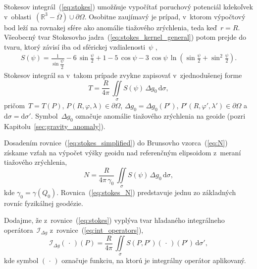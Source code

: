 \documentclass[a4paper, 12pt]{book}
\newcommand{\diff}{\mathrm d}
\begin{document}
Stokesov integrál~(\ref{eq:stokes}) umožňuje vypočítať poruchový potenciál 
kdekoľvek v~oblasti~$\left( \mathbb{R}^3 - \overline\Omega\right) \cup 
\partial\Omega$.  Osobitne zaujímavý je prípad, v~ktorom výpočtový bod leží na 
rovnakej sfére ako anomálie tiažového zrýchlenia, teda keď~$r = R$.  Všeobecný 
tvar Stokesovho jadra~(\ref{eq:stokes_kernel_general}) potom prejde do tvaru, 
ktorý závisí iba od sférickej vzdialenosti~$\psi$ 
\parencite{MoritzPhysicalGeodesy},
%
\begin{equation}
\label{eq:stokes_kernel}
\begin{split}
S(\psi) = \frac{1}{\sin\dfrac{\psi}{2}} - 6 \, \sin\frac{\psi}{2} + 1 - 5 \, 
\cos\psi - 3 \, \cos\psi \, \ln\left( \sin\frac{\psi}{2} + \sin^2\frac{\psi}{2} 
\right){.}
\end{split}
\end{equation}
%
Stokesov integrál sa v~takom prípade zvykne zapisovať v~zjednodušenej forme
%
\begin{equation}
\label{eq:stokes_simplified}
T = \frac{R}{4\pi} \, \iint\limits_{\sigma} S(\psi) \, \Delta g_0 \, \diff 
\sigma{,}
\end{equation}
%
pričom~$T = T(P)$, $P(R, \varphi, \lambda) \in \partial\Omega$, $\Delta g_0 
= \Delta g_0(P')$, $P'(R, \varphi', \lambda') \in \partial\Omega$ 
a~$\diff\sigma = \diff\sigma'$.  Symbol~$\Delta g_0$ označuje anomálie 
tiažového zrýchlenia na geoide (pozri Kapitolu~\ref{sec:gravity_anomaly}).

Dosadením rovnice~(\ref{eq:stokes_simplified}) do Brunsovho vzorca~(\ref{eq:N}) 
získame vzťah na výpočet výšky geoidu nad referenčným elipsoidom z~meraní 
tiažového zrýchlenia,
%
\begin{equation}
\label{eq:stokes_N}
N = \frac{R}{4\pi \, \gamma_0} \, \iint\limits_{\sigma} S(\psi) \, \Delta g_0 
\, \diff \sigma{,}
\end{equation}
%
kde $\gamma_0 = \gamma(Q_0)$.  Rovnica~(\ref{eq:stokes_N}) predstavuje jednu zo 
základných rovníc fyzikálnej geodézie.

Dodajme, že z~rovnice~(\ref{eq:stokes}) vyplýva tvar hľadaného integrálneho 
operátora~$\mathcal{I}_{\Delta g}$ z~rovnice~(\ref{eq:int_operators}),
%
\begin{equation}
\label{eq:iDg}
\mathcal{I}_{\Delta g}( \, \cdot \, )(P) = \frac{R}{4\pi} \, 
\iint\limits_\sigma S(P, P') ( \, \cdot \, )(P') \, \diff\sigma'{,}
\end{equation}
%
kde symbol $(\, \cdot \,)$ označuje funkciu, na ktorú je integrálny operátor 
aplikovaný.
\end{document}
